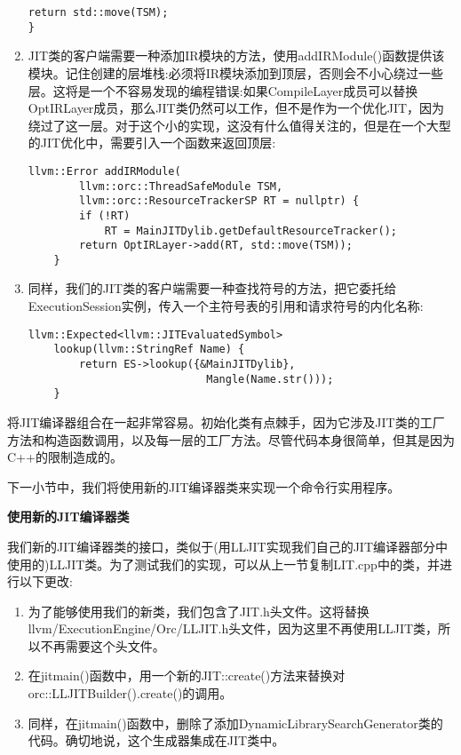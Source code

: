 \begin{enumerate}
\begin{lstlisting}[caption={}]
	return std::move(TSM);
}
\end{lstlisting}

\item JIT类的客户端需要一种添加IR模块的方法，使用addIRModule()函数提供该模块。记住创建的层堆栈:必须将IR模块添加到顶层，否则会不小心绕过一些层。这将是一个不容易发现的编程错误:如果CompileLayer成员可以替换OptIRLayer成员，那么JIT类仍然可以工作，但不是作为一个优化JIT，因为绕过了这一层。对于这个小的实现，这没有什么值得关注的，但是在一个大型的JIT优化中，需要引入一个函数来返回顶层:
\begin{lstlisting}[caption={}]
	llvm::Error addIRModule(
		llvm::orc::ThreadSafeModule TSM,
		llvm::orc::ResourceTrackerSP RT = nullptr) {
		if (!RT)
			RT = MainJITDylib.getDefaultResourceTracker();
		return OptIRLayer->add(RT, std::move(TSM));
	}
\end{lstlisting}

\item 同样，我们的JIT类的客户端需要一种查找符号的方法，把它委托给ExecutionSession实例，传入一个主符号表的引用和请求符号的内化名称:
\begin{lstlisting}[caption={}]
	llvm::Expected<llvm::JITEvaluatedSymbol>
	lookup(llvm::StringRef Name) {
		return ES->lookup({&MainJITDylib},
							Mangle(Name.str()));
	}
\end{lstlisting}

\end{enumerate}

将JIT编译器组合在一起非常容易。初始化类有点棘手，因为它涉及JIT类的工厂方法和构造函数调用，以及每一层的工厂方法。尽管代码本身很简单，但其是因为C++的限制造成的。\par

下一小节中，我们将使用新的JIT编译器类来实现一个命令行实用程序。\par

\hspace*{\fill} \par %
\textbf{使用新的JIT编译器类}

我们新的JIT编译器类的接口，类似于(用LLJIT实现我们自己的JIT编译器部分中使用的)LLJIT类。为了测试我们的实现，可以从上一节复制LIT.cpp中的类，并进行以下更改:\par

\begin{enumerate}
\item 为了能够使用我们的新类，我们包含了JIT.h头文件。这将替换llvm/ExecutionEngine/\allowbreak Orc/LLJIT.h头文件，因为这里不再使用LLJIT类，所以不再需要这个头文件。

\item 在jitmain()函数中，用一个新的JIT::create()方法来替换对orc::LLJITBuilder().create()的调用。

\item 同样，在jitmain()函数中，删除了添加DynamicLibrarySearchGenerator类的代码。确切地说，这个生成器集成在JIT类中。
\end{enumerate}

